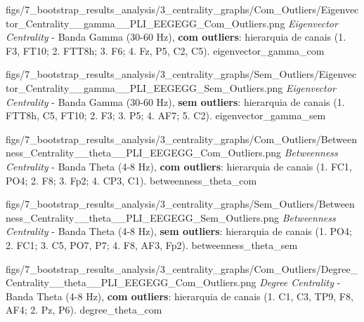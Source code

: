 
\ultrawidefigure
  {figs/7_bootstrap_results_analysis/3_centrality_graphs/Com_Outliers/Eigenvector_Centrality__gamma__PLI_EEGEGG_Com_Outliers.png}
  {\textit{Eigenvector Centrality} - Banda Gamma (30-60 Hz), \textbf{com outliers}: hierarquia de canais (1. F3, FT10; 2. FTT8h; 3. F6; 4. Fz, P5, C2, C5).}
  {eigenvector_gamma_com}

\ultrawidefigure
  {figs/7_bootstrap_results_analysis/3_centrality_graphs/Sem_Outliers/Eigenvector_Centrality__gamma__PLI_EEGEGG_Sem_Outliers.png}
  {\textit{Eigenvector Centrality} - Banda Gamma (30-60 Hz), \textbf{sem outliers}: hierarquia de canais (1. FTT8h, C5, FT10; 2. F3; 3. P5; 4. AF7; 5. C2).}
  {eigenvector_gamma_sem}


\ultrawidefigure
  {figs/7_bootstrap_results_analysis/3_centrality_graphs/Com_Outliers/Betweenness_Centrality__theta__PLI_EEGEGG_Com_Outliers.png}
  {\textit{Betweenness Centrality} - Banda Theta (4-8 Hz), \textbf{com outliers}: hierarquia de canais (1. FC1, PO4; 2. F8; 3. Fp2; 4. CP3, C1).}
  {betweenness_theta_com}

\ultrawidefigure
  {figs/7_bootstrap_results_analysis/3_centrality_graphs/Sem_Outliers/Betweenness_Centrality__theta__PLI_EEGEGG_Sem_Outliers.png}
  {\textit{Betweenness Centrality} - Banda Theta (4-8 Hz), \textbf{sem outliers}: hierarquia de canais (1. PO4; 2. FC1; 3. C5, PO7, P7; 4. F8, AF3, Fp2).}
  {betweenness_theta_sem}


\ultrawidefigure
  {figs/7_bootstrap_results_analysis/3_centrality_graphs/Com_Outliers/Degree_Centrality__theta__PLI_EEGEGG_Com_Outliers.png}
  {\textit{Degree Centrality} - Banda Theta (4-8 Hz), \textbf{com outliers}: hierarquia de canais (1. C1, C3, TP9, F8, AF4; 2. Pz, P6).}
  {degree_theta_com}

